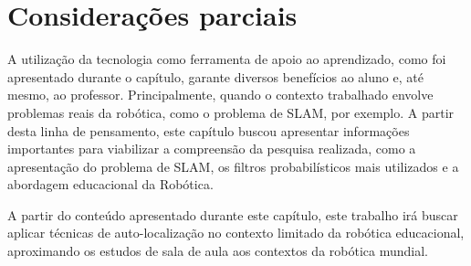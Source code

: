 \section{Considerações parciais} %
\label{sec:considerações_parciais}

	A utilização da tecnologia como ferramenta de apoio ao aprendizado, como foi apresentado durante o capítulo, garante diversos benefícios ao aluno e, até mesmo, ao professor. Principalmente, quando o contexto trabalhado envolve problemas reais da robótica, como o problema de SLAM, por exemplo. A partir desta linha de pensamento, este capítulo buscou apresentar informações importantes para viabilizar a compreensão da pesquisa realizada, como a apresentação do problema de SLAM, os filtros probabilísticos mais utilizados e a abordagem educacional da Robótica.

	A partir do conteúdo apresentado durante este capítulo, este trabalho irá buscar aplicar técnicas de auto-localização no contexto limitado da robótica educacional, aproximando os estudos de sala de aula aos contextos da robótica mundial.

